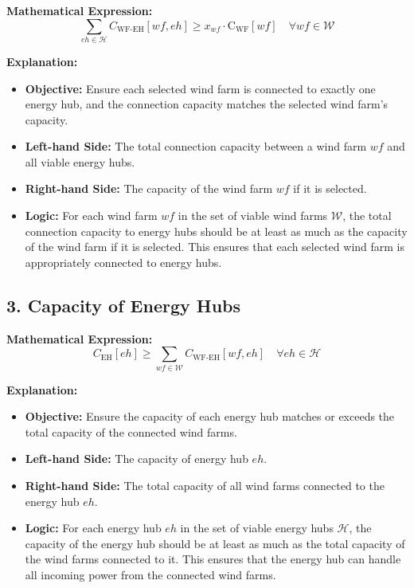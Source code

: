 \textbf{Mathematical Expression:}
\[
\sum_{eh \in \mathcal{H}} C_{\text{WF-EH}}[wf, eh] \geq x_{wf} \cdot \text{C}_{\text{WF}}[wf] \quad \forall wf \in \mathcal{W}
\]

\textbf{Explanation:}
\begin{itemize}
    \item \textbf{Objective:} Ensure each selected wind farm is connected to exactly one energy hub, and the connection capacity matches the selected wind farm's capacity.
    \item \textbf{Left-hand Side:} The total connection capacity between a wind farm \( wf \) and all viable energy hubs.
    \item \textbf{Right-hand Side:} The capacity of the wind farm \( wf \) if it is selected.
    \item \textbf{Logic:} For each wind farm \( wf \) in the set of viable wind farms \( \mathcal{W} \), the total connection capacity to energy hubs should be at least as much as the capacity of the wind farm if it is selected. This ensures that each selected wind farm is appropriately connected to energy hubs.
\end{itemize}

\subsection*{3. Capacity of Energy Hubs}

\textbf{Mathematical Expression:}
\[
C_{\text{EH}}[eh] \geq \sum_{wf \in \mathcal{W}} C_{\text{WF-EH}}[wf, eh] \quad \forall eh \in \mathcal{H}
\]

\textbf{Explanation:}
\begin{itemize}
    \item \textbf{Objective:} Ensure the capacity of each energy hub matches or exceeds the total capacity of the connected wind farms.
    \item \textbf{Left-hand Side:} The capacity of energy hub \( eh \).
    \item \textbf{Right-hand Side:} The total capacity of all wind farms connected to the energy hub \( eh \).
    \item \textbf{Logic:} For each energy hub \( eh \) in the set of viable energy hubs \( \mathcal{H} \), the capacity of the energy hub should be at least as much as the total capacity of the wind farms connected to it. This ensures that the energy hub can handle all incoming power from the connected wind farms.
\end{itemize}

